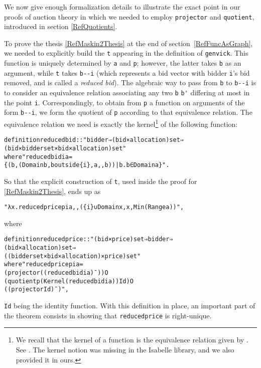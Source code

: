 \documentclass[
]{llncs}
\newenvironment{mytable}{
\vspace{0.2ex}
\begin{center}\begin{minipage}
{0.9\textwidth}\renewcommand{\baselinestretch}{0.75}\begin{small}}
{\end{small}\end{minipage}\end{center}
\vspace{0.1ex}
}
\newcommand{\I}{Isabelle}
\begin{document}
We now give enough formalization details to illustrate the exact point in our proofs of auction theory in which we needed to employ \verb|projector| and \verb|quotient|, introduced in section \ref{RefQuotients}.

To prove the thesis \eqref{RefMaskin2Thesis} at the end of section~\ref{RefFuncAsGraph}, we needed to explicitly build the \verb|t| appearing in the definition of \verb|genvick|. 
This function is uniquely determined by \verb|a| and \verb|p|; however, the latter takes \verb|b| as an argument, while \verb|t| takes \verb|b--i| (which represents a bid vector with bidder \verb|i|'s bid removed, and is called a \emph{reduced bid}).
The algebraic way to pass from \verb|b| to \verb|b--i| is to consider an equivalence relation associating any two \verb|b| \verb|b'| differing at most in the point \verb|i|. Correspondingly, to obtain from \verb|p| a function on arguments of the form \verb|b--i|, we form the quotient of \verb|p| according to that equivalence relation.
The equivalence relation we need is exactly the kernel\footnote{We recall that the kernel of a function  is the equivalence relation  given by . See \cite[Definition~1.18]{bergman2011universal}. The kernel notion was missing in the \I{} library, and we also provided it in ours.}
of the following function:
\begin{mytable}
\begin{alltt}
definition reducedbid:: "bidder ⇒ (bid × allocation) set ⇒ 
(bid × bidder set × bid × allocation) set"
where "reducedbid i a = 
\{(b, (Domain b, b outside \{i\}, a ,, b))| b. b ∈ Domain a\}".
\end{alltt}
\end{mytable}
So that the explicit construction of \verb|t|, used inside the proof for \eqref{RefMaskin2Thesis}, ends up as
\begin{mytable}
\begin{alltt}
"λx. reducedprice p i a ,, (\{i\} ∪ Domain x, x, Min (Range a))", 
\end{alltt}\end{mytable}
where
\begin{mytable}
\begin{alltt}
definition reducedprice:: "(bid × price) set ⇒ bidder ⇒ 
(bid × allocation ) set ⇒ 
((bidder set × bid × allocation) × price) set" 
where "reducedprice p i a = 
(projector ((reducedbid i a)¯)) O 
(quotient p (Kernel (reducedbid i a)) Id) O 
((projector Id)¯)",
\end{alltt}
\end{mytable}
\verb|Id| being the identity function. 
With this definition in place, an important part of the theorem consists in showing that \verb|reducedprice| is right-unique.
\end{document}
